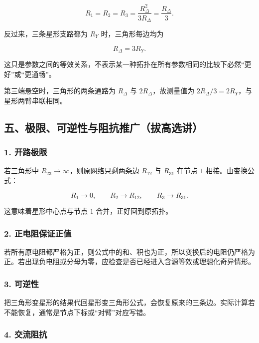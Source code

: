 \[
R_1=R_2=R_3
=\frac{R_{\Delta}^2}{3R_{\Delta}}
=\frac{R_{\Delta}}{3}.
\]

反过来，三条星形支路都为 \(R_Y\) 时，三角形每边均为

\[
R_{\Delta}=3R_Y.
\]

这只是参数之间的等效关系，不表示某一种拓扑在所有参数相同的比较下必然``更好''或``更通畅''。

第三端悬空时，三角形的两条通路为 \(R_{\Delta}\) 与
\(2R_{\Delta}\)，故测量值为 \(2R_{\Delta}/3=2R_Y\)，与星形两臂串联相同。

\subsection{五、极限、可逆性与阻抗推广（拔高选讲）}\label{m4:ux4e94ux6781ux9650ux53efux9006ux6027ux4e0eux963bux6297ux63a8ux5e7fux62d4ux9ad8ux9009ux8bb2}

\subsubsection{1. 开路极限}\label{m4:ux5f00ux8defux6781ux9650}

若三角形中 \(R_{23}\to\infty\)，则原网络只剩两条边 \(R_{12}\) 与
\(R_{31}\) 在节点 \(1\) 相接。由变换公式：

\[
R_1\to0,
\qquad
R_2\to R_{12},
\qquad
R_3\to R_{31}.
\]

这意味着星形中心点与节点 \(1\) 合并，正好回到原拓扑。

\subsubsection{2.
正电阻保证正值}\label{m4:ux6b63ux7535ux963bux4fddux8bc1ux6b63ux503c}

若所有原电阻都严格为正，则公式中的和、积也为正，所以变换后的电阻仍严格为正。若出现负电阻或分母为零，应检查是否已经进入含源等效或理想化奇异情形。

\subsubsection{3. 可逆性}\label{m4:ux53efux9006ux6027}

把三角形变星形的结果代回星形变三角形公式，会恢复原来的三条边。实际计算若不能恢复，通常是节点下标或``对臂''对应写错。

\subsubsection{4. 交流阻抗}\label{m4:ux4ea4ux6d41ux963bux6297}

